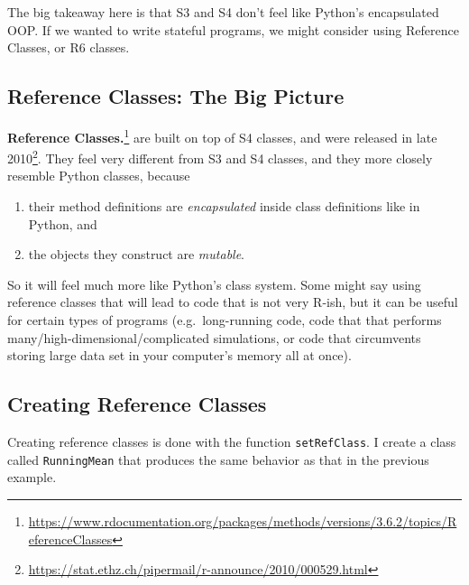 \documentclass[
  12pt,
  krantz2]{krantz}
\providecommand{\tightlist}{%
  \setlength{\itemsep}{0pt}\setlength{\parskip}{0pt}}
\renewcommand{\href}[2]{#2\footnote{\url{#1}}}
\begin{document}
The big takeaway here is that S3 and S4 don't feel like Python's encapsulated OOP. If we wanted to write stateful programs, we might consider using Reference Classes, or R6 classes.

\hypertarget{reference-classes-the-big-picture}{%
\subsection{Reference Classes: The Big Picture}\label{reference-classes-the-big-picture}}

\href{https://www.rdocumentation.org/packages/methods/versions/3.6.2/topics/ReferenceClasses}{\textbf{Reference Classes.}} are built on top of S4 classes, and were released in \href{https://stat.ethz.ch/pipermail/r-announce/2010/000529.html}{late 2010}. They feel very different from S3 and S4 classes, and they more closely resemble Python classes, because

\begin{enumerate}
\def\labelenumi{\arabic{enumi}.}
\tightlist
\item
  their method definitions are \emph{encapsulated} inside class definitions like in Python, and
\item
  the objects they construct are \emph{mutable}.
\end{enumerate}

So it will feel much more like Python's class system. Some might say using reference classes that will lead to code that is not very R-ish, but it can be useful for certain types of programs (e.g.~long-running code, code that that performs many/high-dimensional/complicated simulations, or code that circumvents storing large data set in your computer's memory all at once).

\hypertarget{creating-reference-classes}{%
\subsection{Creating Reference Classes}\label{creating-reference-classes}}

Creating reference classes is done with the function \texttt{setRefClass}. I create a class called \texttt{RunningMean} that produces the same behavior as that in the previous example.
\end{document}
